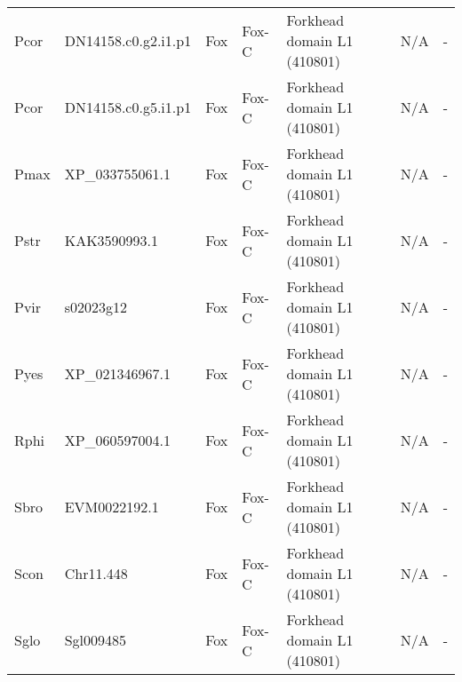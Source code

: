 \documentclass[../main.tex]{subfiles}
\begin{document}
\begin{landscape}
\begin{longtable}{lllllll}
		Pcor           & DN14158.c0.g2.i1.p1   & Fox            & Fox-C               & Forkhead domain L1 (410801)                 & N/A                                                                    & -                    \\
		Pcor           & DN14158.c0.g5.i1.p1   & Fox            & Fox-C               & Forkhead domain L1 (410801)                 & N/A                                                                    & -                    \\
		Pmax           & XP\_033755061.1       & Fox            & Fox-C               & Forkhead domain L1 (410801)                 & N/A                                                                    & -                    \\
		Pstr           & KAK3590993.1          & Fox            & Fox-C               & Forkhead domain L1 (410801)                 & N/A                                                                    & -                    \\
		Pvir           & s02023g12             & Fox            & Fox-C               & Forkhead domain L1 (410801)                 & N/A                                                                    & -                    \\
		Pyes           & XP\_021346967.1       & Fox            & Fox-C               & Forkhead domain L1 (410801)                 & N/A                                                                    & -                    \\
		Rphi           & XP\_060597004.1       & Fox            & Fox-C               & Forkhead domain L1 (410801)                 & N/A                                                                    & -                    \\
		Sbro           & EVM0022192.1          & Fox            & Fox-C               & Forkhead domain L1 (410801)                 & N/A                                                                    & -                    \\
		Scon           & Chr11.448             & Fox            & Fox-C               & Forkhead domain L1 (410801)                 & N/A                                                                    & -                    \\
		Sglo           & Sgl009485             & Fox            & Fox-C               & Forkhead domain L1 (410801)                 & N/A                                                                    & -                    \\

\end{longtable}
\end{landscape}
\end{document}
